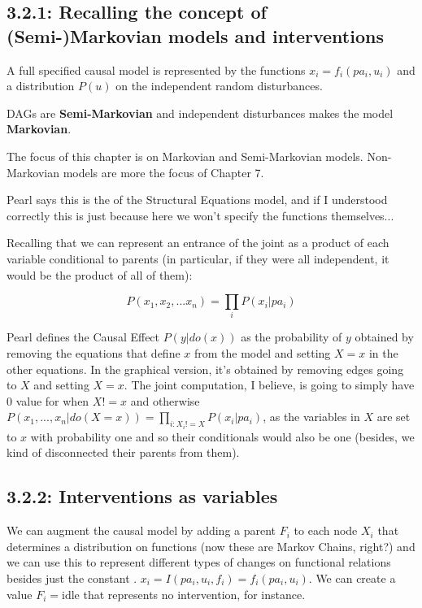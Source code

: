 \subsection{3.2.1: Recalling the concept of (Semi-)Markovian models and interventions}

A full specified causal model is represented by the functions $x_i=f_i(pa_i,u_i)$ and a distribution $P(u)$ on the independent random disturbances.

DAGs are \textbf{Semi-Markovian} and independent disturbances makes the model \textbf{Markovian}.

The focus of this chapter is on Markovian and Semi-Markovian models. Non-Markovian models are more the focus of Chapter 7.

Pearl says this is the  of the Structural Equations model, and if I understood correctly this is just because here we won't specify the functions themselves...

Recalling that we can represent an entrance of the joint as a product of each variable conditional to parents (in particular, if they were all independent, it would be the product of all of them):

$$P(x_1,x_2,...x_n)=\prod\limits_i P(x_i | pa_i)$$

Pearl defines the Causal Effect $P(y|do(x))$ as the probability of $y$ obtained by removing the equations that define $x$ from the model and setting $X=x$ in the other equations. In the graphical version, it's obtained by removing edges going to $X$ and setting $X=x$. The joint computation, I believe, is going to simply have $0$ value for when $X != x$ and otherwise $P(x_1,...,x_n|do(X=x)) = \prod\limits_{i:X_i != X} P(x_i|pa_i)$, as the variables in $X$ are set to $x$ with probability one and so their conditionals would also be one (besides, we kind of disconnected their parents from them).


\subsection{3.2.2: Interventions as variables}

We can augment the causal model by adding a parent $F_i$ to each node $X_i$ that determines a distribution on functions (now these are Markov Chains, right?) and we can use this to represent different types of changes on functional relations besides just the constant . $x_i = I(pa_i,u_i,f_i) = f_i(pa_i,u_i)$. We can create a value $F_i = \text{idle}$ that represents no intervention, for instance. 

